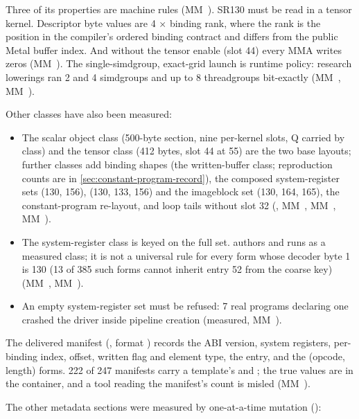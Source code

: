 Three of its properties are machine rules (MM~). SR130 must be read in a tensor kernel. Descriptor byte values
are 4 × binding rank, where the rank is the position in the compiler's ordered binding contract and differs from the
public Metal buffer index. And without the tensor enable (slot 44) every MMA writes zeros (MM~). The single-simdgroup, exact-grid launch is runtime policy: research lowerings ran 2 and 4
simdgroups and up to 8 threadgroups bit-exactly (MM~, MM~).

Other classes have also been measured:

\begin{itemize}
\item The scalar object class (500-byte section, nine per-kernel slots, Q carried by class) and the tensor class (412 bytes,
  slot 44 at 55) are the two base layouts; further classes add binding shapes (the written-buffer class; reproduction counts are in
  \cref{sec:constant-program-record}), the composed system-register sets (130, 156), (130, 133, 156) and the imageblock set (130,
  164, 165), the constant-program re-layout, and loop tails without slot 32 (, MM~, MM~,
  MM~).
\item The system-register class is keyed on the full set.  authors and runs as a measured class; it is not
  a universal rule for every form whose decoder byte 1 is 130 (13 of 385 such forms cannot inherit entry 52 from the
  coarse key) (MM~, MM~).
\item An empty system-register set must be refused: 7 real programs declaring one crashed the driver inside pipeline
  creation (measured, MM~).
\end{itemize}

The delivered manifest (, format ) records the ABI version, system registers,
per-binding index, offset, written flag and element type, the entry, and the (opcode, length) forms. 222 of 247 manifests
carry a template's  and ; the true values are in the container, and a tool reading the
manifest's count is misled (MM~).

The other metadata sections were measured by one-at-a-time mutation ():

